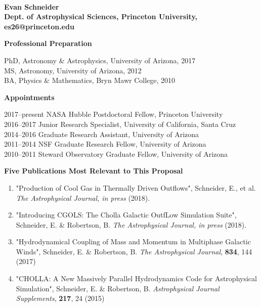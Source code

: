 \documentclass[11pt,letterpaper,english]{article}
\begin{document}
\setlength{\parindent}{0in} %

\pagestyle{fancy}   \renewcommand{%
\headrulewidth}{0.0pt}



\\
{\bf Evan Schneider}\\
{\bf Dept. of Astrophysical Sciences, Princeton University, es26@princeton.edu} \smallskip

\begin{flushleft} {\bf Professional Preparation}
{\parindent 16pt

PhD, Astronomy \& Astrophysics, University of Arizona, 2017 \\ 
MS, Astronomy, University of Arizona, 2012 \\ 
BA, Physics \& Mathematics, Bryn Mawr College, 2010 \\ 
}

\vspace{.04in}
{\bf Appointments}
{\parindent 16pt

2017--present NASA Hubble Postdoctoral Fellow, Princeton University \\ 
2016--2017 Junior Research Specialist, University of California, Santa Cruz \\ 
2014--2016 Graduate Research Assistant, University of Arizona \\ 
2011--2014 NSF Graduate Research Fellow, University of Arizona \\ 
2010--2011 Steward Observatory Graduate Fellow, University of Arizona \\ 
}

\vspace{.04in}
{\bf Five Publications Most Relevant to This Proposal}
\vspace{-6pt}
\begin{enumerate} \itemsep1pt \parskip0pt 
\item "Production of Cool Gas in Thermally Driven Outflows", Schneider, E., et al. \textit{The Astrophysical Journal, in press} (2018).
\item "Introducing CGOLS: The Cholla Galactic OutfLow Simulation Suite", Schneider, E. \& Robertson, B. \textit{The Astrophysical Journal, in press} (2018).
\item "Hydrodynamical Coupling of Mass and Momentum in Multiphase Galactic Winds", Schneider, E. \& Robertson, B. \textit{The Astrophysical Journal}, {\bf 834}, 144 (2017)\\ 
\item "CHOLLA: A New Massively Parallel Hydrodynamics Code for Astrophysical Simulation", Schneider, E. \& Robertson, B. \textit{Astrophysical Journal Supplements}, {\bf 217}, 24 (2015)\\ 
\end{enumerate} 


\end{flushleft}
\end{document}
